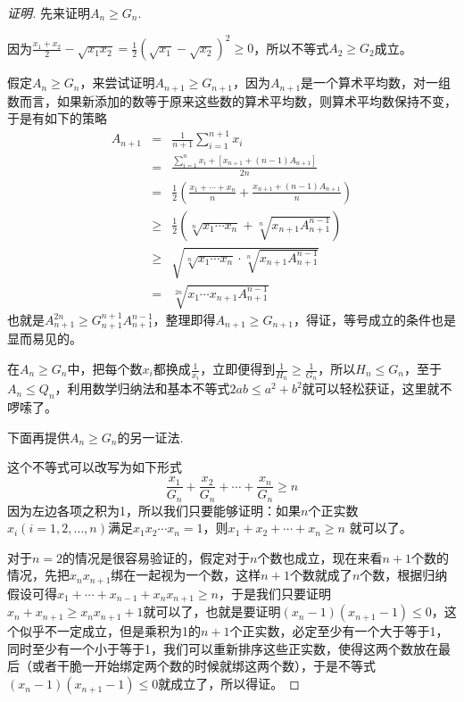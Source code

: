 \begin{proof}[证明]
  先来证明$A_n\geqslant G_n$.

  因为$\frac{x_1+x_2}{2}-\sqrt{x_1x_2}=\frac{1}{2}(\sqrt{x_1}-\sqrt{x_2})^2 \geqslant 0$，所以不等式$A_2 \geqslant G_2$成立。

  假定$A_n \geqslant G_n$，来尝试证明$A_{n+1} \geqslant G_{n+1}$，因为$A_{n+1}$是一个算术平均数，对一组数而言，如果新添加的数等于原来这些数的算术平均数，则算术平均数保持不变，于是有如下的策略
  \begin{eqnarray*}
    A_{n+1} &=& \frac{1}{n+1}\sum_{i=1}^{n+1}x_{i} \\
            &=& \frac{\sum_{i=1}^nx_i+[x_{n+1}+(n-1)A_{n+1}]}{2n} \\
            &=& \frac{1}{2} \left( \frac{x_1+\cdots+x_{n}}{n} + \frac{x_{n+1}+(n-1)A_{n+1}}{n} \right) \\
    & \geqslant & \frac{1}{2} \left( \sqrt[n]{x_1\cdots x_n} + \sqrt[n]{x_{n+1}A_{n+1}^{n-1}} \right) \\
            & \geqslant & \sqrt{\sqrt[n]{x_1\cdots x_n} \cdot \sqrt[n]{x_{n+1}A_{n+1}^{n-1}}} \\
    &=& \sqrt[2n]{x_1\cdots x_{n+1}A_{n+1}^{n-1}}
  \end{eqnarray*}
  也就是$A_{n+1}^{2n} \geqslant G_{n+1}^{n+1}A_{n+1}^{n-1}$，整理即得$A_{n+1} \geqslant G_{n+1}$，得证，等号成立的条件也是显而易见的。

  在$A_n \geqslant G_n$中，把每个数$x_i$都换成$\frac{1}{x_i}$，立即便得到$\frac{1}{H_n} \geqslant \frac{1}{G_n}$，所以$H_n \leqslant G_n$，至于$A_n \leqslant Q_n$，利用数学归纳法和基本不等式$2ab \leqslant a^2+b^2$就可以轻松获证，这里就不啰嗦了。

  下面再提供$A_n \geqslant G_n$的另一证法.

  这个不等式可以改写为如下形式
  \begin{equation*}
    \frac{x_1}{G_n} + \frac{x_2}{G_n} + \cdots + \frac{x_n}{G_n} \geqslant n
  \end{equation*}
  因为左边各项之积为1，所以我们只要能够证明：如果$n$个正实数$x_i(i=1,2,\ldots,n)$满足$x_1x_2\cdots x_n=1$，则$x_1+x_2+\cdots +x_n \geqslant n$ 就可以了。

  对于$n=2$的情况是很容易验证的，假定对于$n$个数也成立，现在来看$n+1$个数的情况，先把$x_nx_{n+1}$绑在一起视为一个数，这样$n+1$个数就成了$n$个数，根据归纳假设可得$x_1+\cdots + x_{n-1} + x_nx_{n+1} \geqslant n$，于是我们只要证明$x_n+x_{n+1} \geqslant x_nx_{n+1}+1$就可以了，也就是要证明$(x_n-1)(x_{n+1}-1)\leqslant 0$，这个似乎不一定成立，但是乘积为1的$n+1$个正实数，必定至少有一个大于等于1，同时至少有一个小于等于1，我们可以重新排序这些正实数，使得这两个数放在最后（或者干脆一开始绑定两个数的时候就绑这两个数），于是不等式$(x_n-1)(x_{n+1}-1)\leqslant 0$就成立了，所以得证。
\end{proof}


